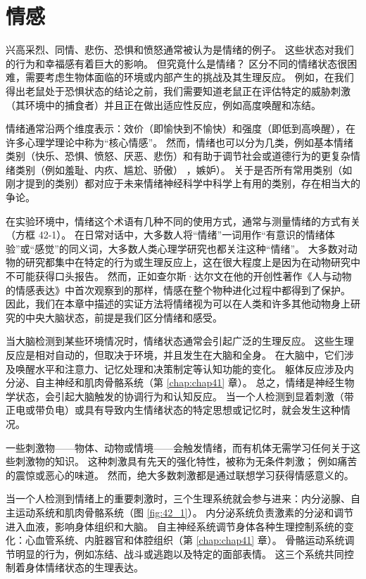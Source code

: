 \chapter{情感} \label{chap:chap42}

兴高采烈、同情、悲伤、恐惧和愤怒通常被认为是情绪的例子。
这些状态对我们的行为和幸福感有着巨大的影响。
但究竟什么是情绪？
区分不同的情绪状态很困难，需要考虑生物体面临的环境或内部产生的挑战及其生理反应。
例如，在我们得出老鼠处于恐惧状态的结论之前，我们需要知道老鼠正在评估特定的威胁刺激（其环境中的捕食者）并且正在做出适应性反应，例如高度唤醒和冻结。


情绪通常沿两个维度表示：效价（即愉快到不愉快）和强度（即低到高唤醒），在许多心理学理论中称为“核心情感”。
然而，情绪也可以分为几类，例如基本情绪类别（快乐、恐惧、愤怒、厌恶、悲伤）和有助于调节社会或道德行为的更复杂情绪类别（例如羞耻、内疚、尴尬、骄傲） ，嫉妒）。
关于是否所有常用类别（如刚才提到的类别）都对应于未来情绪神经科学中科学上有用的类别，存在相当大的争论。


在实验环境中，情绪这个术语有几种不同的使用方式，通常与测量情绪的方式有关（方框 42-1）。
在日常对话中，大多数人将“情绪”一词用作“有意识的情绪体验”或“感觉”的同义词，大多数人类心理学研究也都关注这种“情绪”。
大多数对动物的研究都集中在特定的行为或生理反应上，这在很大程度上是因为在动物研究中不可能获得口头报告。
然而，正如查尔斯·达尔文在他的开创性著作《人与动物的情感表达》中首次观察到的那样，情感在整个物种进化过程中都得到了保护。 因此，我们在本章中描述的实证方法将情绪视为可以在人类和许多其他动物身上研究的中央大脑状态，前提是我们区分情绪和感受。

当大脑检测到某些环境情况时，情绪状态通常会引起广泛的生理反应。 这些生理反应是相对自动的，但取决于环境，并且发生在大脑和全身。 在大脑中，它们涉及唤醒水平和注意力、记忆处理和决策制定等认知功能的变化。 躯体反应涉及内分泌、自主神经和肌肉骨骼系统（第 \ref{chap:chap41} 章）。 总之，情绪是神经生物学状态，会引起大脑触发的协调行为和认知反应。 当一个人检测到显着刺激（带正电或带负电）或具有导致内生情绪状态的特定思想或记忆时，就会发生这种情况。

一些刺激物——物体、动物或情境——会触发情绪，而有机体无需学习任何关于这些刺激物的知识。 这种刺激具有先天的强化特性，被称为无条件刺激； 例如痛苦的震惊或恶心的味道。 然而，绝大多数刺激都是通过联想学习获得情感意义的。

当一个人检测到情绪上的重要刺激时，三个生理系统就会参与进来：内分泌腺、自主运动系统和肌肉骨骼系统（图 \ref{fig:42_1}）。 
内分泌系统负责激素的分泌和调节进入血液，影响身体组织和大脑。 自主神经系统调节身体各种生理控制系统的变化：心血管系统、内脏器官和体腔组织（第 \ref{chap:chap41} 章）。 骨骼运动系统调节明显的行为，例如冻结、战斗或逃跑以及特定的面部表情。 这三个系统共同控制着身体情绪状态的生理表达。


